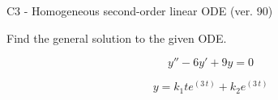 \begin{exercise}
  \begin{exerciseTitle}C3 - Homogeneous second-order linear ODE (ver. 90)\end{exerciseTitle}
  \begin{exerciseStatement}
    
Find the general solution to the given ODE.

    
\[y''-6y'+9y = 0\]

  \end{exerciseStatement}
  \begin{exerciseAnswer}
    
\[y= k_{1} t e^{\left(3 \, t\right)} + k_{2} e^{\left(3 \, t\right)}\]

  \end{exerciseAnswer}
\end{exercise}